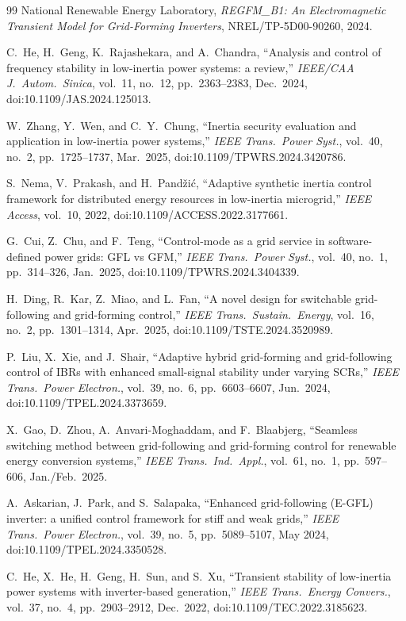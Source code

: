 \documentclass[12pt,a4paper]{article}
\theoremstyle{remark}
\begin{document}
\begin{thebibliography}{99}
 National Renewable Energy Laboratory, \emph{REGFM\_B1: An
Electromagnetic Transient Model for Grid-Forming Inverters}, NREL/TP-5D00-90260,
2024.

 C.~He, H.~Geng, K.~Rajashekara, and A.~Chandra, ``Analysis and
control of frequency stability in low-inertia power systems: a review,''
\emph{IEEE/CAA J.\ Autom.\ Sinica}, vol.~11, no.~12, pp.~2363--2383, Dec.\ 2024,
doi:10.1109/JAS.2024.125013.

 W.~Zhang, Y.~Wen, and C.~Y.~Chung, ``Inertia security
evaluation and application in low-inertia power systems,'' \emph{IEEE Trans.\
Power Syst.}, vol.~40, no.~2, pp.~1725--1737, Mar.\ 2025,
doi:10.1109/TPWRS.2024.3420786.

 S.~Nema, V.~Prakash, and H.~Pand\v{z}i\'{c}, ``Adaptive
synthetic inertia control framework for distributed energy resources in
low-inertia microgrid,'' \emph{IEEE Access}, vol.~10, 2022,
doi:10.1109/ACCESS.2022.3177661.

 G.~Cui, Z.~Chu, and F.~Teng, ``Control-mode as a grid service in
software-defined power grids: GFL vs GFM,'' \emph{IEEE Trans.\ Power Syst.},
vol.~40, no.~1, pp.~314--326, Jan.\ 2025, doi:10.1109/TPWRS.2024.3404339.

 H.~Ding, R.~Kar, Z.~Miao, and L.~Fan, ``A novel design for
switchable grid-following and grid-forming control,'' \emph{IEEE Trans.\ Sustain.\
Energy}, vol.~16, no.~2, pp.~1301--1314, Apr.\ 2025,
doi:10.1109/TSTE.2024.3520989.

 P.~Liu, X.~Xie, and J.~Shair, ``Adaptive hybrid grid-forming and
grid-following control of IBRs with enhanced small-signal stability under varying
SCRs,'' \emph{IEEE Trans.\ Power Electron.}, vol.~39, no.~6, pp.~6603--6607,
Jun.\ 2024, doi:10.1109/TPEL.2024.3373659.

 X.~Gao, D.~Zhou, A.~Anvari-Moghaddam, and F.~Blaabjerg,
``Seamless switching method between grid-following and grid-forming control for
renewable energy conversion systems,'' \emph{IEEE Trans.\ Ind.\ Appl.}, vol.~61,
no.~1, pp.~597--606, Jan./Feb.\ 2025.

 A.~Askarian, J.~Park, and S.~Salapaka, ``Enhanced
grid-following (E-GFL) inverter: a unified control framework for stiff and weak
grids,'' \emph{IEEE Trans.\ Power Electron.}, vol.~39, no.~5, pp.~5089--5107,
May 2024, doi:10.1109/TPEL.2024.3350528.

 C.~He, X.~He, H.~Geng, H.~Sun, and S.~Xu, ``Transient stability
of low-inertia power systems with inverter-based generation,'' \emph{IEEE Trans.\
Energy Convers.}, vol.~37, no.~4, pp.~2903--2912, Dec.\ 2022,
doi:10.1109/TEC.2022.3185623.


\end{thebibliography}
\end{document}
